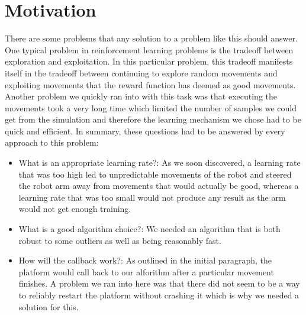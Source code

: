 \section{Motivation} \label{sec:motivation}

There are some problems that any solution to a problem like this should answer. One typical problem in reinforcement learning problems is the tradeoff between exploration and exploitation. In this particular problem, this tradeoff manifests itself in the tradeoff between continuing to explore random movements and exploiting movements that the reward function has deemed as good movements. 
Another problem we quickly ran into with this task was that executing the movements took a very long time which limited the number of samples we could get from the simulation and therefore the learning mechanism we chose had to be quick and efficient. 
In summary, these questions had to be answered by every approach to this problem:

\begin{itemize}
	\item What is an appropriate learning rate?: As we soon discovered, a learning rate that was too high led to unpredictable movements of the robot and steered the robot arm away from movements that would actually be good, whereas a learning rate that was too small would not produce any result as the arm would not get enough training.
	\item What is a good algorithm choice?: We needed an algorithm that is both robust to some outliers as well as being reasonably fast.
	\item How will the callback work?: As outlined in the initial paragraph, the platform would call back to our alforithm after a particular movement finishes. A problem we ran into here was that there did not seem to be a way to reliably restart the platform without crashing it which is why we needed a solution for this.
\end{itemize}

